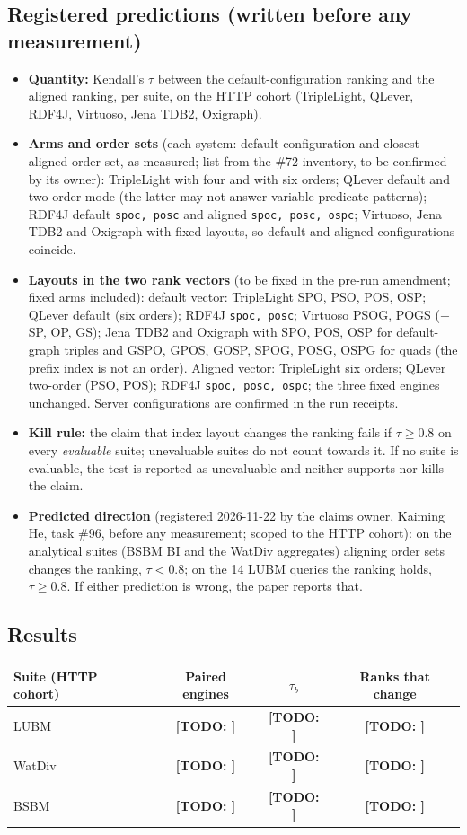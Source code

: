 \documentclass[11pt]{article}
\newcommand{\todo}[1]{\textbf{[TODO: #1]}}
\begin{document}
\subsection{Registered predictions (written before any measurement)}
\begin{itemize}
  \item \textbf{Quantity:} Kendall's $\tau$ between the default-configuration ranking and the aligned ranking, per suite, on the HTTP cohort (TripleLight, QLever, RDF4J, Virtuoso, Jena TDB2, Oxigraph).
  \item \textbf{Arms and order sets} (each system: default configuration and closest aligned order set, as measured; list from the \#72 inventory, to be confirmed by its owner):
  TripleLight with four and with six orders; QLever default and two-order mode (the latter may not answer variable-predicate patterns);
  RDF4J default \texttt{spoc, posc} and aligned \texttt{spoc, posc, ospc}; Virtuoso, Jena TDB2 and Oxigraph with fixed layouts, so default and aligned configurations coincide.
  \item \textbf{Layouts in the two rank vectors} (to be fixed in the pre-run amendment; fixed arms included): default vector: TripleLight SPO, PSO, POS, OSP; QLever default (six orders); RDF4J \texttt{spoc, posc}; Virtuoso PSOG, POGS (+ SP, OP, GS); Jena TDB2 and Oxigraph with SPO, POS, OSP for default-graph triples and GSPO, GPOS, GOSP, SPOG, POSG, OSPG for quads (the prefix index is not an order). Aligned vector: TripleLight six orders; QLever two-order (PSO, POS); RDF4J \texttt{spoc, posc, ospc}; the three fixed engines unchanged. Server configurations are confirmed in the run receipts.
  \item \textbf{Kill rule:} the claim that index layout changes the ranking fails if $\tau \ge 0.8$ on every \emph{evaluable} suite; unevaluable suites do not count towards it. If no suite is evaluable, the test is reported as unevaluable and neither supports nor kills the claim.
  \item \textbf{Predicted direction} (registered 2026-11-22 by the claims owner, Kaiming He, task \#96, before any measurement; scoped to the HTTP cohort):
  on the analytical suites (BSBM BI and the WatDiv aggregates) aligning order sets changes the ranking, $\tau < 0.8$;
  on the 14 LUBM queries the ranking holds, $\tau \ge 0.8$. If either prediction is wrong, the paper reports that.
\end{itemize}
\subsection{Results}
\begin{tabular}{lccc}\toprule Suite (HTTP cohort) & Paired engines & $\tau_b$ & Ranks that change\\\midrule
LUBM & \todo{} & \todo{} & \todo{}\\ WatDiv & \todo{} & \todo{} & \todo{}\\ BSBM & \todo{} & \todo{} & \todo{}\\\bottomrule\end{tabular}
\end{document}
